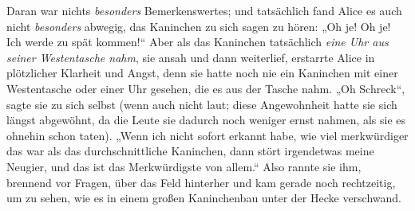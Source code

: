 Daran war nichts \emph{besonders} Bemerkenswertes; und tatsächlich fand Alice es auch nicht \emph{besonders} abwegig, das Kaninchen zu sich sagen zu hören:
„Oh je! Oh je! Ich werde zu spät kommen!“ Aber als das Kaninchen tatsächlich \emph{eine Uhr aus seiner Westentasche nahm}, sie ansah und dann weiterlief, erstarrte Alice in plötzlicher Klarheit und Angst, denn sie hatte noch nie ein Kaninchen mit einer Westentasche oder einer Uhr gesehen, die es aus der Tasche nahm.
„Oh Schreck“, sagte sie zu sich selbst (wenn auch nicht laut; diese Angewohnheit hatte sie sich längst abgewöhnt, da die Leute sie dadurch noch weniger ernst nahmen, als sie es ohnehin schon taten).
„Wenn ich nicht sofort erkannt habe, wie viel merkwürdiger das war als das durchschnittliche Kaninchen, dann stört irgendetwas meine Neugier, und das ist das Merkwürdigste von allem.“ Also rannte sie ihm, brennend vor Fragen, über das Feld hinterher und kam gerade noch rechtzeitig, um zu sehen, wie es in einem großen Kaninchenbau unter der Hecke verschwand.

